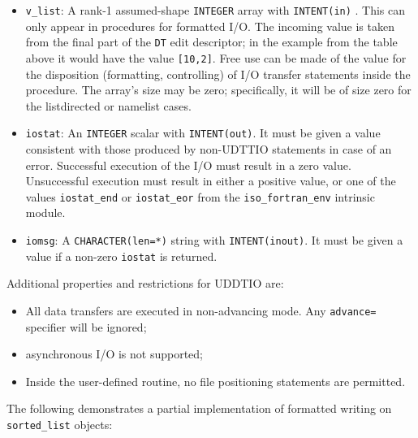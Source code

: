 \documentclass[
  paper=a4,
  ,captions=tableheading
]{scrartcl}
\providecommand{\tightlist}{%
  \setlength{\itemsep}{0pt}\setlength{\parskip}{0pt}}
\begin{document}
\begin{itemize}
\tightlist
\item
  \texttt{v\_list}: A rank-1 assumed-shape \texttt{INTEGER} array with
  \texttt{INTENT(in)} . This can only appear in procedures for formatted
  I/O. The incoming value is taken from the final part of the
  \texttt{DT} edit descriptor; in the example from the table above it
  would have the value \texttt{{[}10,2{]}}. Free use can be made of the
  value for the disposition (formatting, controlling) of I/O transfer
  statements inside the procedure. The array's size may be zero;
  specifically, it will be of size zero for the listdirected or namelist
  cases.
\item
  \texttt{iostat}: An \texttt{INTEGER} scalar with \texttt{INTENT(out)}.
  It must be given a value consistent with those produced by non-UDTTIO
  statements in case of an error. Successful execution of the I/O must
  result in a zero value. Unsuccessful execution must result in either a
  positive value, or one of the values \texttt{iostat\_end} or
  \texttt{iostat\_eor} from the \texttt{iso\_fortran\_env} intrinsic
  module.
\item
  \texttt{iomsg}: A \texttt{CHARACTER(len=*)} string with
  \texttt{INTENT(inout)}. It must be given a value if a non-zero
  \texttt{iostat} is returned.
\end{itemize}

Additional properties and restrictions for UDDTIO are:

\begin{itemize}
\tightlist
\item
  All data transfers are executed in non-advancing mode. Any
  \texttt{advance=} specifier will be ignored;
\item
  asynchronous I/O is not supported;
\item
  Inside the user-defined routine, no file positioning statements are
  permitted.
\end{itemize}

The following demonstrates a partial implementation of formatted writing
on \texttt{sorted\_list} objects:
\end{document}
